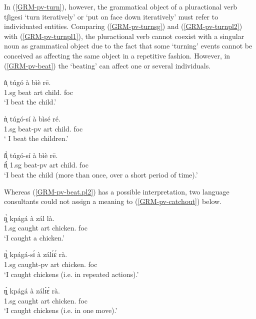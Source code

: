 \begin{exe}
\begin{exe}
\begin{exe}
{\begin{exe}
\begin{exe}
\begin{exe}
\begin{exe}
\begin{exe}
\begin{exe}
\begin{exe}
\begin{exe}
\begin{exe}
\begin{exe}
\begin{exe}
\begin{exe}
\begin{exe}
\begin{exe}
\begin{exe}
\begin{exe}
\begin{exe}
\begin{exe}
\begin{exe}
\begin{exe}
\begin{exe}
In (\ref{GRM-pv-turn}), however,  the 
grammatical object of a
pluractional verb {\sls tʃigesi} `turn iteratively' or `put on face
down iteratively'  must refer to individuated entities. Comparing  
(\ref{GRM-pv-turnsg}) and (\ref{GRM-pv-turnpl2}) with 
(\ref{GRM-pv-turnpl1}),   the pluractional verb cannot coexist with a singular
noun as grammatical object due to the fact that  some `turning' events cannot be
conceived as affecting the same object in a repetitive fashion. However, in
(\ref{GRM-pv-beat}) the `beating' can affect  one or several
individuals. 


\ea\label{GRM-pv-beat}
  
 \ea\label{GRM-pv-beat.sg}
\gll   ǹ̩   túgó  à bìè  rē.\\
   {\sc 1.sg}  {beat} {\sc art} {child.\sg} {\sc foc}\\
\glt `I beat the child.'

\ex\label{GRM-pv-beat.pl1}
\gll   ǹ̩ túgó-sí  à bìsé  ré.\\
   {\sc 1.sg}   {beat-{\sc pv}} {\sc art} {child.\pl} {\sc foc}\\
\glt ` I beat the children.'


\ex\label{GRM-pv-beat.pl2}
\gll ñ̩̀ túgó-sí  à  bìè  rē.\\
    ñ̩̀  {\sc 1.sg} {beat-{\sc pv}} {\sc art}  {child.\sg} {\sc foc} 
\\
\glt `I beat the child (more than once, over a short period of time).'


 
\z 
 \z

Whereas  (\ref{GRM-pv-beat.pl2})
has a possible interpretation, two language consultants
could not assign a meaning to (\ref{GRM-pv-catchout}) below. 




\ea\label{GRM-pv-catch}
  
 \ea\label{GRM-pv-catchsg}
\gll ŋ̩̀  kpágá  à  zál  là.\\
   {\sc 1.sg}   {caught} {\sc art} {chicken.\sg} {\sc foc}\\
\glt `I caught a chicken.'


 \ex\label{GRM-pv-catchpl1}
\gll ŋ̩̀ kpágá-sɪ́  à  zálɪ́ɛ́ rà.\\
    {\sc 1.sg} {caught-{\sc pv}} {\sc art} {chicken.\pl} {\sc foc}\\
\glt `I caught chickens (i.e. in repeated actions).'


 \ex\label{GRM-pv-catchpl2}
\gll   ŋ̩̀  kpágá  à  zálɪ́ɛ́ rà.\\
    {\sc 1.sg}  {caught} {\sc art} {chicken.\pl} {\sc foc}\\
\glt `I caught chickens (i.e. in one move).'



\end{exe}
\end{exe}
\end{exe}
\end{exe}
\end{exe}
\end{exe}
\end{exe}
\end{exe}
\end{exe}
\end{exe}
\end{exe}
\end{exe}
\end{exe}
\end{exe}
\end{exe}
\end{exe}
\end{exe}
\end{exe}
\end{exe}
\end{exe}
\end{exe}}
\end{exe}
\end{exe}
\end{exe}
